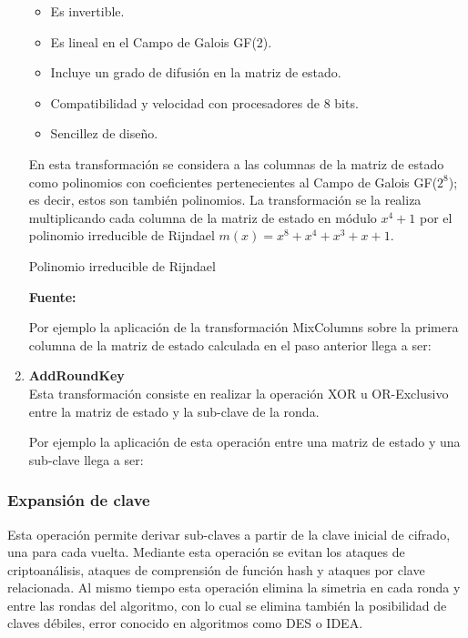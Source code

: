 \documentclass[../main/main.tex]{subfiles}
\begin{document}
\begin{enumerate}[label=\textbf{\arabic*}.]
          \begin{itemize}[noitemsep,nolistsep]
            \item Es invertible.
            \item Es lineal en el Campo de Galois GF(2).
            \item Incluye un grado de difusión en la matriz de estado.
            \item Compatibilidad y velocidad con procesadores de 8 bits.
            \item Sencillez de diseño.
          \end{itemize}

          En esta transformación se considera a las columnas de la matriz de estado como polinomios con coeficientes pertenecientes al Campo de Galois GF($2^8$); es decir, estos son también polinomios. La transformación se la realiza multiplicando cada columna de la matriz de estado en módulo $x^4 + 1$ por el polinomio irreducible de Rijndael $m(x) = x^8 + x^4 + x^3 + x + 1$.

          \begin{table}[H]
            \centering
            \caption{Polinomio irreducible de Rijndael}
            
            \caption*{\textbf{Fuente:} \cite{report:seguridad_europea_eeuu}}
          \end{table}

          Por ejemplo la aplicación de la transformación MixColumns sobre la primera columna de la matriz de estado calculada en el paso anterior llega a ser:

          

        \item \textbf{AddRoundKey} \\
          Esta transformación consiste en realizar la operación XOR u OR-Exclusivo entre la matriz de estado y la sub-clave de la ronda.

          Por ejemplo la aplicación de esta operación entre una matriz de estado y una sub-clave llega a ser:

          
      \end{enumerate}

    \subsubsection{Expansión de clave}
      Esta operación permite derivar sub-claves a partir de la clave inicial de cifrado, una para cada vuelta. Mediante esta operación se evitan los ataques de criptoanálisis, ataques de comprensión de función hash y ataques por clave relacionada. Al mismo tiempo esta operación elimina la simetria en cada ronda y entre las rondas del algoritmo, con lo cual se elimina también la posibilidad de claves débiles, error conocido en algoritmos como DES o IDEA.
\end{document}
